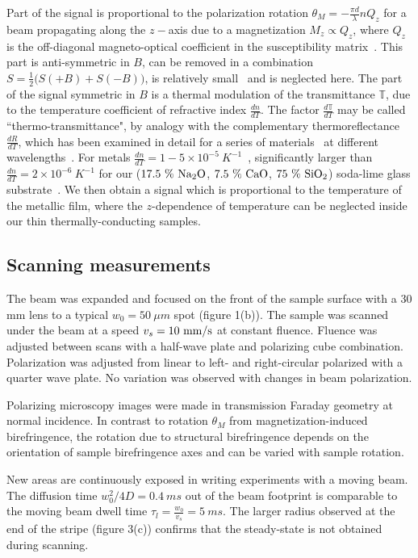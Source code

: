 \documentclass[5p]{elsarticle}
\begin{document}
Part of the signal is proportional to the polarization rotation $\theta_{M}=-\frac{\pi d}{\lambda}nQ_{z}$ for a beam propagating along the $z-$axis due to a magnetization $M_{z} \propto Q_{z}$, where $Q_{z}$ is the off-diagonal magneto-optical coefficient in the susceptibility matrix~\cite{2000Qiu}. This part is anti-symmetric in $B$, can be removed in a combination $S=\frac{1}{2}\Big( S(+B)+S(-B) \Big)$, is relatively small~\cite{2017F-arXiv} and is neglected here. The part of the signal symmetric in $B$ is a thermal modulation of the transmittance $\mathbb{T}$, due to the temperature coefficient of refractive index $\frac{dn}{dT}$. The factor $\frac{d\mathbb{T}}{dT}$ may be called ``thermo-transmittance", by analogy with the complementary thermoreflectance $\frac{dR}{dT}$, which has been examined in detail for a series of materials~\cite{2010Wang} at different wavelengths~\cite{2012Wilson}. For metals $\frac{dn}{dT}=1-5\times 10^{-5}~K^{-1}$~\cite{2010Wang,2012Wilson}, significantly larger than $\frac{dn}{dT}=2\times 10^{-6}~K^{-1}$ for our ($\rm 17.5~\%~ Na_{2}O$, $\rm 7.5~\%~CaO$, $\rm 75~\% ~SiO_{2}$) soda-lime glass substrate~\cite{1993Jewell}. We then obtain a signal which is proportional to the temperature of the metallic film, where the $z$-dependence of temperature can be neglected inside our thin thermally-conducting samples.

\subsection{Scanning measurements}

The beam was expanded and focused on the front of the sample surface with a 30 mm lens to a typical $w_{0}=50~\mu m$ spot (figure 1(b)). The sample was scanned under the beam at a speed $v_{s}=10~\rm{mm/s}$ at constant fluence. Fluence was adjusted between scans with a half-wave plate and polarizing cube combination. Polarization was adjusted from linear to left- and right-circular polarized with a quarter wave plate. No variation was observed with changes in beam polarization.

Polarizing microscopy images were made in transmission Faraday geometry at normal incidence. In contrast to rotation $\theta_{M}$ from magnetization-induced birefringence, the rotation due to structural birefringence depends on the orientation of sample birefringence axes and can be varied with sample rotation.

New areas are continuously exposed in writing experiments with a moving beam. The diffusion time $w_{0}^2/4D = 0.4~ms$ out of the beam footprint is comparable to the moving beam dwell time $\tau_{l} = \frac{w_{0}}{v_{s}} = 5~ms$. The larger radius observed at the end of the stripe (figure 3(c)) confirms that the steady-state is not obtained during scanning.
\end{document}

